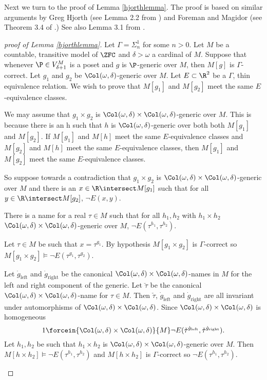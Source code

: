 \documentclass[oneside,12pt]{amsart}
\begin{document}
Next we turn to the proof of Lemma \ref{hjorthlemma}.
The proof is based on similar arguments by Greg Hjorth (see Lemma 2.2 from \cite{Hjorth_applications_of_course_imt}) and Foreman and Magidor (see Theorem 3.4 of \cite{Foreman_and_Magidor}.)
See also Lemma 3.1 from \cite{Schlict_Thin_Equivalence_Relations}.

\begin{proof}[proof of Lemma \ref{hjorthlemma}]
Let $\Gamma = \Sigma^1_n$ for some $n>0$.
Let $M$ be a countable, transitive model of $\ZFC$ and  $\delta>\omega$ a cardinal of $M$.
Suppose that whenever $\P\in V^M_{\delta+1}$ is a poset and $g$ is $\P$-generic over $M$, then
$M[g]$ is $\Gamma$-correct. Let $g_1$ and $g_2$ be $\Col(\omega, \delta)$-generic over $M$.
Let $E\subset\R^2$ be a $\Gamma$, thin equivalence relation.
We wish to prove that $M[g_1]$ and $M[g_2]$ meet the same $E$-equivalence classes.

We may assume that $g_1\times g_2$ is $\Col(\omega, \delta)\times \Col(\omega, \delta)$-generic over $M$.
This is because there is an h such that $h$ is $\Col(\omega, \delta)$-generic over both
both $M[g_1]$ and $M[g_2]$. If $M[g_1]$ and $M[h]$ meet the same $E$-equivalence classes and
$M[g_2]$ and $M[h]$ meet the same $E$-equivalence classes, then
$M[g_1]$ and $M[g_2]$ meet the same $E$-equivalence classes.

So suppose towards a contradiction that $g_1\times g_2$ is $\Col(\omega, \delta)\times \Col(\omega, \delta)$-generic over $M$
and there is an $x\in\R\intersect M[g_1]$ such that for all $y\in \R\intersect M[g_2]$, $\neg E(x,y)$.

\begin{claim}[Claim 1]
There is a name for a real $\tau\in M$ such that for all $h_1,h_2$
with $h_1\times h_2$ $\Col(\omega, \delta)\times \Col(\omega, \delta)$-generic over $M$,
$\neg E(\tau^{h_1},\tau^{h_2})$.
\end{claim}
\begin{subproof}
Let $\tau\in M$ be such that $x=\tau^{g_1}$. By hypothesis $M[g_1\times g_2]$ is $\Gamma$-correct
so $M[g_1\times g_2]\models \neg E(\tau^{g_1},\tau^{g_2})$.

Let $\dot{g}_{\text{left}}$ and $\dot{g}_{\text{right}}$
be the canonical $\Col(\omega, \delta)\times \Col(\omega, \delta)$-names in $M$ for the left and right component of the generic.
Let $\check{\tau}$ be the canonical $\Col(\omega, \delta)\times \Col(\omega, \delta)$-name for $\tau\in M$.
Then $\check{\tau}$, $\dot{g}_{\text{left}}$ and $\dot{g}_{\text{right}}$ are all invariant under automorphisms of $\Col(\omega, \delta)\times \Col(\omega, \delta)$.
Since $\Col(\omega, \delta)\times \Col(\omega, \delta)$ is homogeneous
$$1\forcein{\Col(\omega, \delta)\times \Col(\omega, \delta)}{M} \neg E(\check{\tau}^{\dot{g}_{\text{left}}},\check{\tau}^{\dot{g}_{\text{right}}}).$$
Let $h_1,h_2$ be such that $h_1\times h_2$ is $\Col(\omega, \delta)\times \Col(\omega, \delta)$-generic over $M$.
Then $M[h\times h_2]\models \neg E(\tau^{h_1},\tau^{h_2})$ and $M[h\times h_2]$ is $\Gamma$-correct so $\neg E(\tau^{h_1},\tau^{h_2})$.
\end{subproof}


\end{proof}
\end{document}
